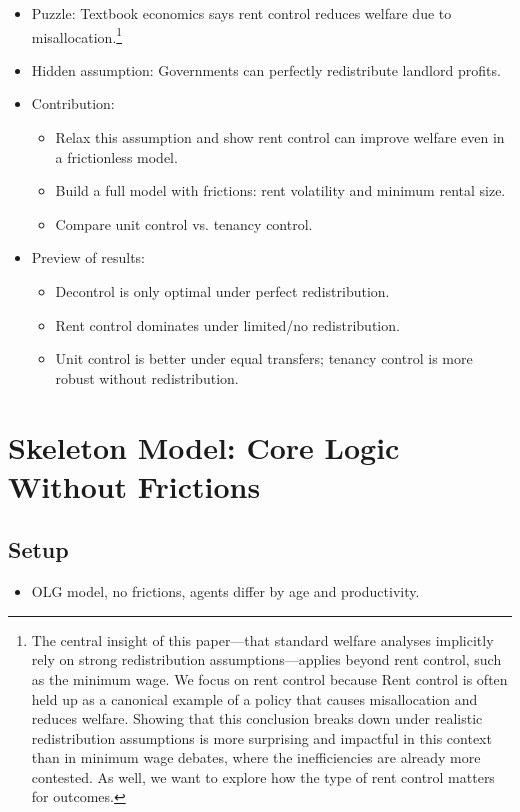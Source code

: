 \documentclass[11pt]{article}
\begin{document}
 
\begin{itemize}[leftmargin=*]
    \item Puzzle: Textbook economics says rent control reduces welfare due to misallocation.\footnote{The central insight of this paper—that standard welfare analyses implicitly rely on strong redistribution assumptions—applies beyond rent control, such as the minimum wage. We focus on rent control because Rent control is often held up as a canonical example of a policy that causes misallocation and reduces welfare. Showing that this conclusion breaks down under realistic redistribution assumptions is more surprising and impactful in this context than in minimum wage debates, where the inefficiencies are already more contested. As well, we want to explore how the type of rent control matters for outcomes.}
    \item Hidden assumption: Governments can perfectly redistribute landlord profits.
    \item Contribution:
    \begin{itemize}
        \item Relax this assumption and show rent control can improve welfare even in a frictionless model.
        \item Build a full model with frictions: rent volatility and minimum rental size.
        \item Compare unit control vs. tenancy control.
    \end{itemize}
    \item Preview of results:
    \begin{itemize}
        \item Decontrol is only optimal under perfect redistribution.
        \item Rent control dominates under limited/no redistribution.
        \item Unit control is better under equal transfers; tenancy control is more robust without redistribution.
    \end{itemize}
\end{itemize}

\section{Skeleton Model: Core Logic Without Frictions}

\subsection{Setup}
\begin{itemize}[leftmargin=*]
    \item OLG model, no frictions, agents differ by age and productivity.
\end{itemize}
\end{document}
